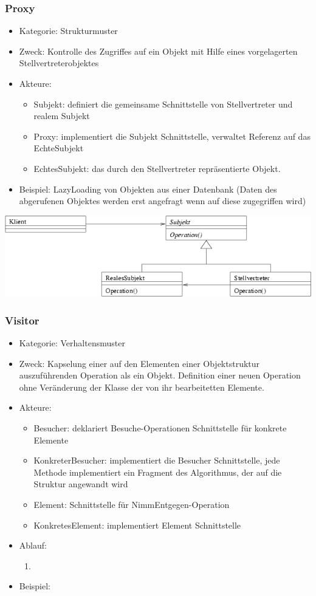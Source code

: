 \documentclass[11pt, fleqn, a4paper, leqno]{scrartcl} %
\begin{document}
		\subsubsection{Proxy}
			\begin{itemize}
				\item Kategorie: Strukturmuster
				\item Zweck: Kontrolle des Zugriffes auf ein Objekt mit Hilfe eines vorgelagerten Stellvertreterobjektes
				\item Akteure: 
					\begin{itemize}
						\item Subjekt: definiert die gemeinsame Schnittstelle von Stellvertreter und realem Subjekt
						\item Proxy: implementiert die Subjekt Schnittstelle, verwaltet Referenz auf das EchteSubjekt
						\item EchtesSubjekt: das durch den Stellvertreter repräsentierte Objekt.
					\end{itemize}
				\item Beispiel: LazyLoading von Objekten aus einer Datenbank (Daten des abgerufenen Objektes werden erst angefragt wenn auf diese zugegriffen wird)
			\end{itemize}
			\includegraphics[scale=0.7]{images/proxy.png}
			\newpage
		\subsubsection{Visitor}
			\begin{itemize}
				\item Kategorie: Verhaltensmuster
				\item Zweck: Kapselung einer auf den Elementen einer Objektstruktur auszuführenden Operation als ein Objekt. Definition einer neuen Operation ohne Veränderung der Klasse der von ihr bearbeitetten Elemente.
				\item Akteure: 
					\begin{itemize}
						\item Besucher: deklariert Besuche-Operationen Schnittstelle für konkrete Elemente
						\item KonkreterBesucher: implementiert die Besucher Schnittstelle, jede Methode implementiert ein Fragment des Algorithmus, der auf die Struktur angewandt wird
						\item Element: Schnittstelle für NimmEntgegen-Operation
						\item KonkretesElement: implementiert Element Schnittstelle
					\end{itemize}
				\item Ablauf:
					\begin{enumerate}
						\item
					\end{enumerate}
				\item Beispiel:			
			\end{itemize}
\end{document}
